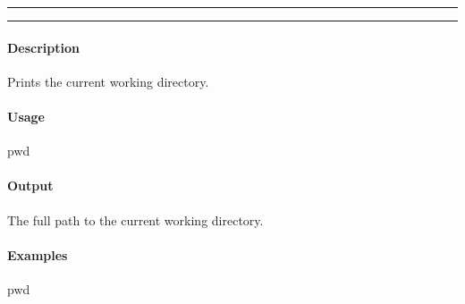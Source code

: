 \hrule
\vspace{1mm}
\hrule
\vspace{4mm}

\paragraph{Description}
\indentpar \raggedright \textrm{Prints the current working directory.}\\

\paragraph{Usage}
\indentpar pwd \textit{}

\paragraph{Output}
\indentpar \textrm{The full path to the current working directory.}

\paragraph{Examples}
\indentpar pwd 

\vspace{20mm}
